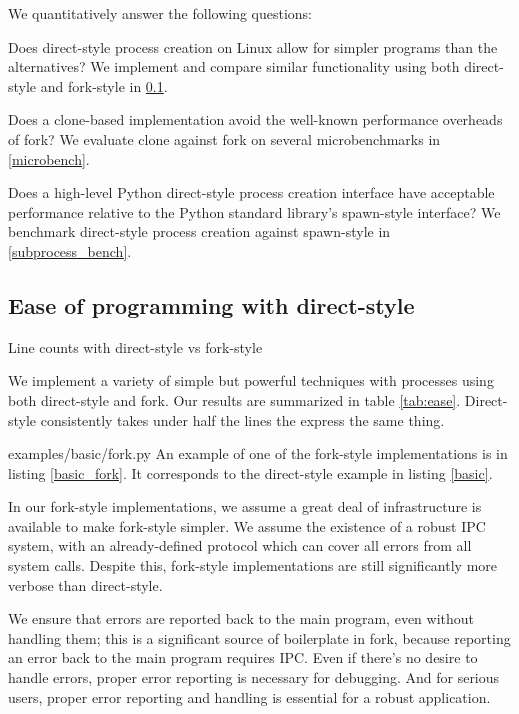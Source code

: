 \documentclass[letterpaper,twocolumn,10pt]{article}
\begin{document}
We quantitatively answer the following questions:
\begin{compactitem}
\item
  Does direct-style process creation on Linux allow for simpler programs than the alternatives?
  We implement and compare similar functionality using both direct-style and fork-style in \ref{ease}.
\item
  Does a clone-based implementation avoid the well-known performance overheads of fork?
  We evaluate clone against fork on several microbenchmarks in \ref{microbench}.
\item
  Does a high-level Python direct-style process creation interface
  have acceptable performance relative to the Python standard library's spawn-style interface?
  We benchmark direct-style process creation against spawn-style in \ref{subprocess_bench}.
\end{compactitem}
\subsection{Ease of programming with direct-style}\label{ease}
\begin{table}

\caption{Line counts with direct-style vs fork-style}
\label{tab:ease}
\end{table}
We implement a variety of simple but powerful techniques with processes
using both direct-style and fork.
Our results are summarized in table \ref{tab:ease}.
Direct-style consistently takes under half the lines the express the same thing.

{examples/basic/fork.py}
An example of one of the fork-style implementations is in listing \ref{basic_fork}.
It corresponds to the direct-style example in listing \ref{basic}.

In our fork-style implementations,
we assume a great deal of infrastructure is available to make fork-style simpler.
We assume the existence of a robust IPC system,
with an already-defined protocol which can cover all errors from all system calls.
Despite this, fork-style implementations are still significantly more verbose than direct-style.

We ensure that errors are reported back to the main program,
even without handling them;
this is a significant source of boilerplate in fork,
because reporting an error back to the main program requires IPC.
Even if there's no desire to handle errors,
proper error reporting is necessary for debugging.
And for serious users, proper error reporting and handling
is essential for a robust application.
\end{document}
